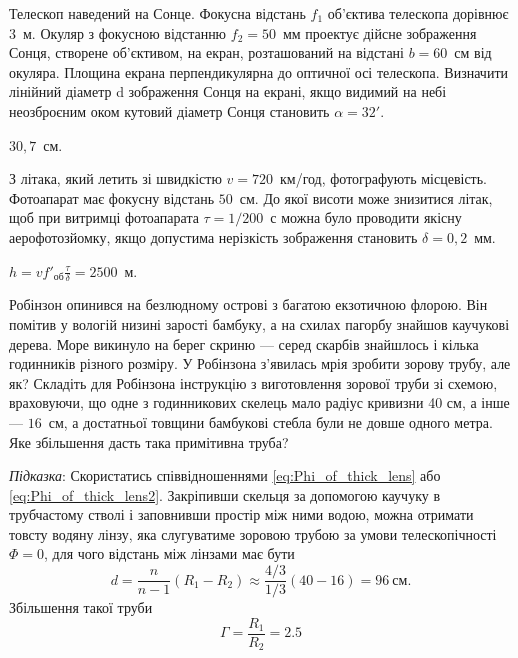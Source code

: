 \begin{problem}%
Телескоп наведений на Сонце. Фокусна відстань $f_1$ об'єктива
телескопа дорівнює $3$~м. Окуляр з фокусною відстанню $f_2 = 50$~мм
проектує дійсне зображення Сонця, створене об'єктивом, на екран,
розташований на відстані $b = 60$~см від окуляра. Площина екрана
перпендикулярна до оптичної осі телескопа. Визначити лінійний
діаметр d зображення Сонця на екрані, якщо видимий на небі
неозброєним оком кутовий діаметр Сонця становить $\alpha = 32'$.
\begin{solution}
	$30,7$~см.
\end{solution}
\end{problem}


\begin{problem}%
З літака, який летить зі швидкістю $v = 720$~км/год, фотографують
місцевість. Фотоапарат має фокусну відстань $50$~см. До якої висоти
може знизитися літак, щоб при витримці фотоапарата $\tau = 1/200$~с можна
було проводити якісну аерофотозйомку, якщо допустима нерізкість
зображення становить $\delta = 0,2$~мм.
\begin{solution}
	$h = v f'_\text{об} \frac{\tau}{\delta} = 2500$~м.
\end{solution}
\end{problem}


\begin{problem}%
Робінзон опинився на безлюдному острові з багатою екзотичною
флорою. Він помітив у вологій низині зарості бамбуку, а на схилах
пагорбу знайшов каучукові дерева. Море викинуло на берег скриню ---
серед скарбів знайшлось і кілька годинників різного розміру. У
Робінзона з’явилась мрія зробити зорову трубу, але як? Складіть для
Робінзона інструкцію з виготовлення зорової труби зі схемою,
враховуючи, що одне з годинникових скелець мало радіус кривизни 40
см, а інше --- $16$~см, а достатньої товщини бамбукові стебла були не
довше одного метра. Яке збільшення дасть така примітивна труба?
\begin{solution}
	\emph{Підказка}: Скористатись співвідношеннями \eqref{eq:Phi_of_thick_lens} або \eqref{eq:Phi_of_thick_lens2}.
	Закріпивши скельця за допомогою каучуку в трубчастому стволі і
	заповнивши простір між ними водою, можна отримати товсту водяну
	лінзу, яка слугуватиме зоровою трубою за умови телескопічності $\Phi = 0$,
	для чого відстань між лінзами має бути
	\begin{equation*}
		d = \frac{n}{n - 1}(R_1 - R_2) \approx \frac{4/3}{1/3}(40-16) = 96\ \text{см}.
	\end{equation*}
	Збільшення такої труби
	\begin{equation*}
		\Gamma = \frac{R_1}{R_2} = 2.5
	\end{equation*}
\end{solution}
\end{problem}


